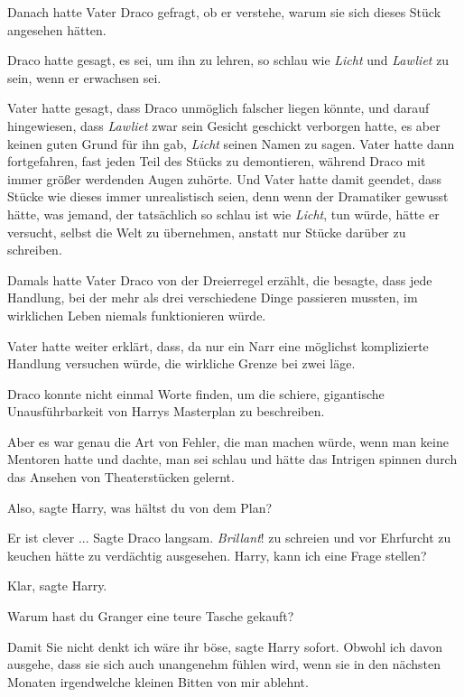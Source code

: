 Danach hatte Vater Draco gefragt, ob er verstehe, warum sie sich dieses Stück
angesehen hätten.

Draco hatte gesagt, es sei, um ihn zu lehren, so schlau wie \emph{Licht} und
\emph{Lawliet} zu sein, wenn er erwachsen sei.

Vater hatte gesagt, dass Draco unmöglich falscher liegen könnte, und darauf
hingewiesen, dass \emph{Lawliet} zwar sein Gesicht geschickt verborgen hatte, es
aber keinen guten Grund für ihn gab, \emph{Licht} seinen Namen zu sagen. Vater
hatte dann fortgefahren, fast jeden Teil des Stücks zu demontieren, während
Draco mit immer größer werdenden Augen zuhörte. Und Vater hatte damit geendet,
dass Stücke wie dieses immer unrealistisch seien, denn wenn der Dramatiker
gewusst hätte, was jemand, der tatsächlich so schlau ist wie \emph{Licht}, tun
würde, hätte er versucht, selbst die Welt zu übernehmen, anstatt nur Stücke
darüber zu schreiben.

Damals hatte Vater Draco von der Dreierregel erzählt, die besagte, dass jede
Handlung, bei der mehr als drei verschiedene Dinge passieren mussten, im
wirklichen Leben niemals funktionieren würde.

Vater hatte weiter erklärt, dass, da nur ein Narr eine möglichst komplizierte
Handlung versuchen würde, die wirkliche Grenze bei zwei läge.

Draco konnte nicht einmal Worte finden, um die schiere, gigantische
Unausführbarkeit von Harrys Masterplan zu beschreiben.

Aber es war genau die Art von Fehler, die man machen würde, wenn man keine
Mentoren hatte und dachte, man sei schlau und hätte das Intrigen spinnen durch
das Ansehen von Theaterstücken gelernt.

\glqq{}Also\grqq{}, sagte Harry, \glqq{}was hältst du von dem Plan?\grqq{}

\glqq{}Er ist clever ...\grqq{} Sagte Draco langsam. \emph{Brillant}! zu schreien
und vor Ehrfurcht zu keuchen hätte zu verdächtig ausgesehen. \glqq{}Harry, kann
ich eine Frage stellen?\grqq{}

\glqq{}Klar\grqq{}, sagte Harry.

\glqq{}Warum hast du Granger eine teure Tasche gekauft?\grqq{}

\glqq{}Damit Sie nicht denkt ich wäre ihr böse\grqq{}, sagte Harry sofort. \glqq{}
Obwohl ich davon ausgehe, dass sie sich auch unangenehm fühlen wird, wenn sie in
den nächsten Monaten irgendwelche kleinen Bitten von mir ablehnt.\grqq{}

